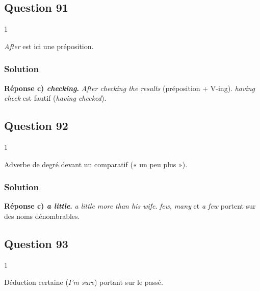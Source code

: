 \documentclass[11pt,a4paper]{article}
\begin{document}
\hypertarget{question-91}{%
\subsection{Question 91}\label{question-91}}

\begin{indication}{1}

\emph{After} est ici une préposition.

\end{indication}

\hypertarget{solution-90}{%
\subsubsection{Solution}\label{solution-90}}

\textbf{Réponse c) \emph{checking}.} \emph{After checking the results} (préposition + V-ing). \emph{having check} est fautif (\emph{having checked}).

\hypertarget{question-92}{%
\subsection{Question 92}\label{question-92}}

\begin{indication}{1}

Adverbe de degré devant un comparatif (« un peu plus »).

\end{indication}

\hypertarget{solution-91}{%
\subsubsection{Solution}\label{solution-91}}

\textbf{Réponse c) \emph{a little}.} \emph{a little more than his wife}. \emph{few}, \emph{many} et \emph{a few} portent sur des noms dénombrables.

\hypertarget{question-93}{%
\subsection{Question 93}\label{question-93}}

\begin{indication}{1}

Déduction certaine (\emph{I'm sure}) portant sur le passé.

\end{indication}
\end{document}
